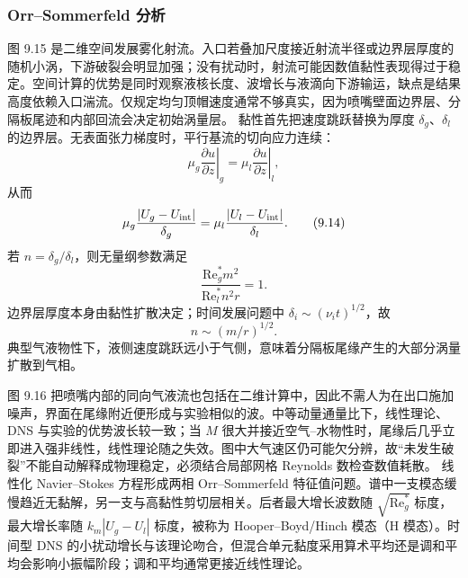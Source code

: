 \documentclass[11pt,a4paper,openany,fontset=none]{ctexbook}
\begin{document}
\subsubsection{Orr--Sommerfeld 分析}

图 9.15 是二维空间发展雾化射流。入口若叠加尺度接近射流半径或边界层厚度的随机小涡，下游破裂会明显加强；没有扰动时，射流可能因数值黏性表现得过于稳定。空间计算的优势是同时观察液核长度、波增长与液滴向下游输运，缺点是结果高度依赖入口湍流。仅规定均匀顶帽速度通常不够真实，因为喷嘴壁面边界层、分隔板尾迹和内部回流会决定初始涡量层。
黏性首先把速度跳跃替换为厚度 $\delta_g$、$\delta_l$ 的边界层。无表面张力梯度时，平行基流的切向应力连续：
\begin{equation}
 \left.\mu_g\frac{\partial u}{\partial z}\right|_g
 =\left.\mu_l\frac{\partial u}{\partial z}\right|_l,
 \tag{9.13}
\end{equation}
从而
\begin{equation}
 \mu_g\frac{|U_g-U_{\rm int}|}{\delta_g}
 =\mu_l\frac{|U_l-U_{\rm int}|}{\delta_l}.
 \tag{9.14}
\end{equation}
若 $n=\delta_g/\delta_l$，则无量纲参数满足
\begin{equation}
 \frac{\mathrm{Re}_g^*m^2}{\mathrm{Re}_l^*n^2r}=1.
 \tag{9.15}
\end{equation}
边界层厚度本身由黏性扩散决定；时间发展问题中
$\delta_i\sim(\nu_it)^{1/2}$，故
\begin{equation}
 n\sim(m/r)^{1/2}.
 \tag{9.16}
\end{equation}
典型气液物性下，液侧速度跳跃远小于气侧，意味着分隔板尾缘产生的大部分涡量扩散到气相。

图 9.16 把喷嘴内部的同向气液流也包括在二维计算中，因此不需人为在出口施加噪声，界面在尾缘附近便形成与实验相似的波。中等动量通量比下，线性理论、DNS 与实验的优势波长较一致；当 $M$ 很大并接近空气--水物性时，尾缘后几乎立即进入强非线性，线性理论随之失效。图中大气速区仍可能欠分辨，故“未发生破裂”不能自动解释成物理稳定，必须结合局部网格 Reynolds 数检查数值耗散。
线性化 Navier--Stokes 方程形成两相 Orr--Sommerfeld 特征值问题。谱中一支模态缓慢趋近无黏解，另一支与高黏性剪切层相关。后者最大增长波数随 $\sqrt{\mathrm{Re}_g^*}$ 标度，最大增长率随 $k_m|U_g-U_l|$ 标度，被称为 Hooper--Boyd/Hinch 模态（H 模态）。时间型 DNS 的小扰动增长与该理论吻合，但混合单元黏度采用算术平均还是调和平均会影响小振幅阶段；调和平均通常更接近线性理论。
\end{document}
